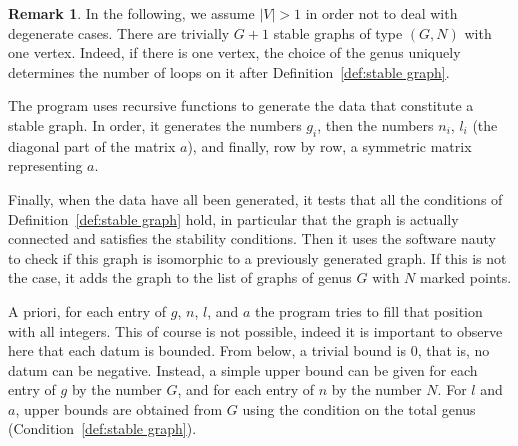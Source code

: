 \documentclass{amsart}
\theoremstyle{plain}
\theoremstyle{definition}
\newtheorem{remark}[theorem]{Remark}
\newcommand{\abs}[1]{\left|#1\right|}
\begin{document}
\begin{remark}
  In the following, we assume $\abs{V} > 1$ in order not to deal with
  degenerate cases. There are trivially $G+1$ stable graphs of type
  $(G, N)$ with one vertex. Indeed, if there is one vertex, the choice
  of the genus uniquely determines the number of loops on it after
  Definition~\ref{def:stable graph}.
\end{remark}

The program uses recursive functions to generate the data that
constitute a stable graph. In order, it generates the numbers $g_i$,
then the numbers $n_i$, $l_i$ (the diagonal part of the matrix $a$),
and finally, row by row, a symmetric matrix representing $a$.

Finally, when the data have all been generated, it tests that all the
conditions of Definition~\ref{def:stable graph} hold, in particular
that the graph is actually connected and satisfies the stability
conditions. Then it uses the software nauty \cite{nauty} to check if
this graph is isomorphic to a previously generated graph. If this is
not the case, it adds the graph to the list of graphs of genus $G$
with $N$ marked points.




A priori, for each entry of $g$, $n$, $l$, and $a$ the program tries
to fill that position with all integers. This of course is not
possible, indeed it is important to observe here that each datum is
bounded. From below, a trivial bound is $0$, that is, no datum can be
negative. Instead, a simple upper bound can be given for each entry of
$g$ by the number $G$, and for each entry of $n$ by the number
$N$. For $l$ and $a$, upper bounds are obtained from $G$ using the
condition on the total genus (Condition~\ref{def:stable graph}).
\end{document}
